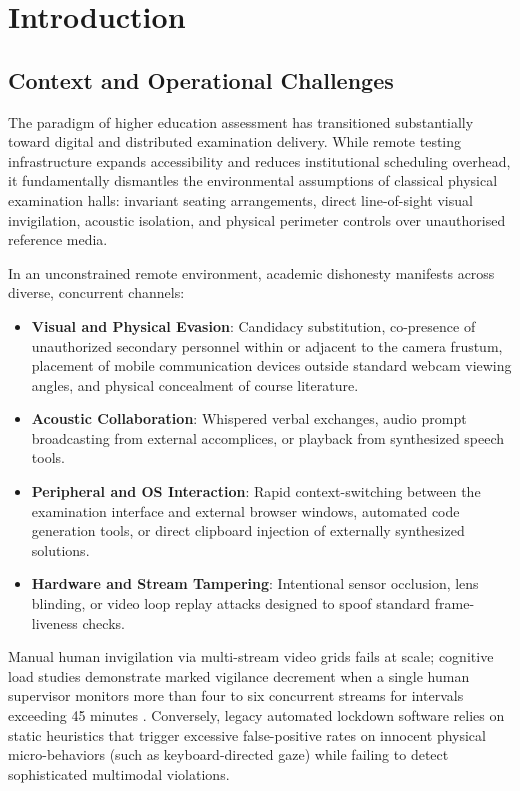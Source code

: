 \renewcommand{\baselinestretch}{1.5}\normalsize
\chapter{Introduction}

\section{Context and Operational Challenges}

The paradigm of higher education assessment has transitioned substantially toward digital and distributed examination delivery. While remote testing infrastructure expands accessibility and reduces institutional scheduling overhead, it fundamentally dismantles the environmental assumptions of classical physical examination halls: invariant seating arrangements, direct line-of-sight visual invigilation, acoustic isolation, and physical perimeter controls over unauthorised reference media.

In an unconstrained remote environment, academic dishonesty manifests across diverse, concurrent channels:
\begin{itemize}
    \item \textbf{Visual and Physical Evasion}: Candidacy substitution, co-presence of unauthorized secondary personnel within or adjacent to the camera frustum, placement of mobile communication devices outside standard webcam viewing angles, and physical concealment of course literature.
    \item \textbf{Acoustic Collaboration}: Whispered verbal exchanges, audio prompt broadcasting from external accomplices, or playback from synthesized speech tools.
    \item \textbf{Peripheral and OS Interaction}: Rapid context-switching between the examination interface and external browser windows, automated code generation tools, or direct clipboard injection of externally synthesized solutions.
    \item \textbf{Hardware and Stream Tampering}: Intentional sensor occlusion, lens blinding, or video loop replay attacks designed to spoof standard frame-liveness checks.
\end{itemize}

Manual human invigilation via multi-stream video grids fails at scale; cognitive load studies demonstrate marked vigilance decrement when a single human supervisor monitors more than four to six concurrent streams for intervals exceeding 45 minutes \cite{vigilance1948, proctoru2020}. Conversely, legacy automated lockdown software relies on static heuristics that trigger excessive false-positive rates on innocent physical micro-behaviors (such as keyboard-directed gaze) while failing to detect sophisticated multimodal violations.

